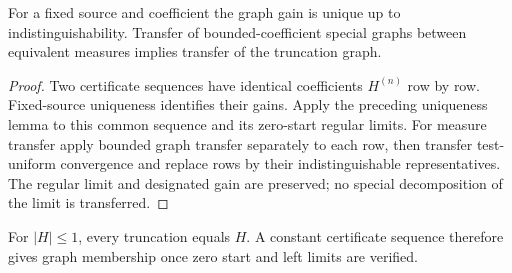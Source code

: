 \begin{proposition}
For a fixed source and coefficient the graph gain is unique up to
indistinguishability. Transfer of bounded-coefficient special graphs between
equivalent measures implies transfer of the truncation graph.
\end{proposition}
\begin{proof}
Two certificate sequences have identical coefficients $H^{(n)}$ row by row.
Fixed-source uniqueness identifies their gains. Apply the preceding uniqueness
lemma to this common sequence and its zero-start regular limits.
For measure transfer apply bounded graph transfer separately to each row,
then transfer test-uniform convergence and replace rows by their
indistinguishable representatives. The regular limit and designated gain are
preserved; no special decomposition of the limit is transferred.
\end{proof}
For $|H|\leq1$, every truncation equals $H$. A constant certificate sequence
therefore gives graph membership once zero start and left limits are verified.

